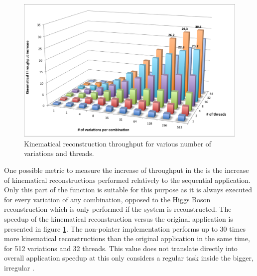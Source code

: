 \begin{figure}[!htp]
	\begin{center}
		\includegraphics[scale=0.6]{../../common/graphs/dilep_throughput.png}
		\caption{Kinematical reconstruction throughput for various number of variations and threads.}
		\label{fig:DilepThroughput}
	\end{center}
\end{figure}

One possible metric to measure the increase of throughput in the \ttDilepKinFit is the increase of kinematical reconstructions performed relatively to the sequential application. Only this part of the function is suitable for this purpose as it is always executed for every variation of any combination, opposed to the Higgs Boson reconstruction which is only performed if the \ttbar system is reconstructed. The speedup of the kinematical reconstruction versus the original application is presented in figure \ref{fig:DilepThroughput}. The non-pointer implementation performs up to 30 times more kinematical reconstructions than the original application in the same time, for 512 variations and 32 threads. This value does not translate directly into overall application speedup at this only considers a regular task inside the bigger, irregular \ttDilepKinFit.

